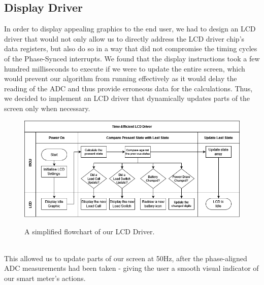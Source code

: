 \documentclass[9pt, technote, a4paper, nofonttune]{IEEEphot}
\begin{document}
        \subsection{Display Driver}
        \hspace{0.5cm}In order to display appealing graphics to the end user, we had to design an LCD driver that would not only allow us to directly address the LCD driver chip's data registers, but also do so in a way that did not compromise the timing cycles of the Phase-Synced interrupts.
        We found that the display instructions took a few hundred milliseconds to execute if we were to update the entire screen, which would prevent our algorithm from running effectively as it would delay the reading of the ADC and thus provide erroneous data for the calculations.
        Thus, we decided to implement an LCD driver that dynamically updates parts of the screen only when necessary.
        \begin{figure}[h]
        \centering
        \includegraphics[width=30pc]{D5/LCD timing.drawio.png}
        \label{fig_env1}
        \caption{A simplified flowchart of our LCD Driver.}
        \end{figure}
        \\
        This allowed us to update parts of our screen at 50Hz, after the phase-aligned ADC measurements had been taken - giving the user a smooth visual indicator of our smart meter's actions.
\end{document}
